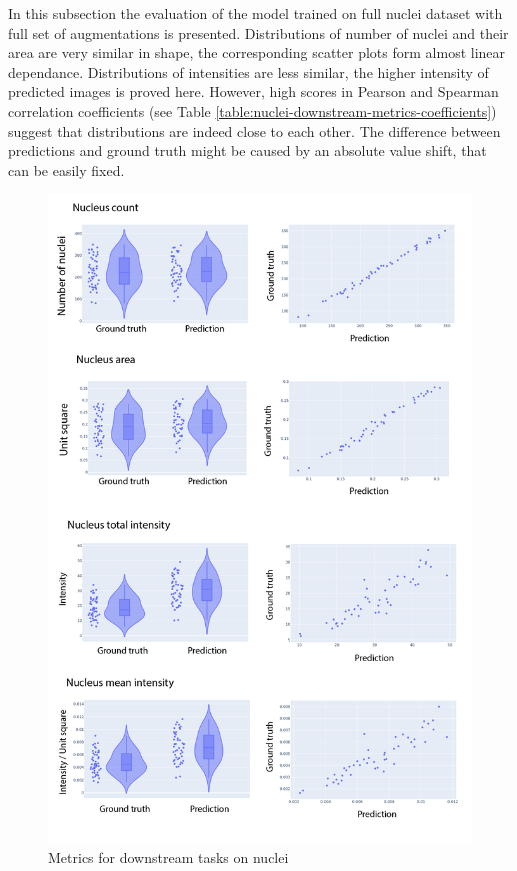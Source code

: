 In this subsection the evaluation of the model trained on full nuclei dataset with full set of augmentations is presented. Distributions of number of nuclei and their area are very similar in shape, the corresponding scatter plots form almost linear dependance. Distributions of intensities are less similar, the higher intensity of predicted images is proved here. However, high scores in Pearson and Spearman correlation coefficients (see Table \ref{table:nuclei-downstream-metrics-coefficients}) suggest that distributions are indeed close to each other. The difference between predictions and ground truth might be caused by an absolute value shift, that can be easily fixed.
\begin{figure}[htb]
	\begin{center}
		\includegraphics[width=\linewidth]{bilder/nuclei/metric/combined-metrics.png}
		\caption{Metrics for downstream tasks on nuclei}\label{fig:nuclei-downstream-metrics}
	\end{center}
\end{figure}

